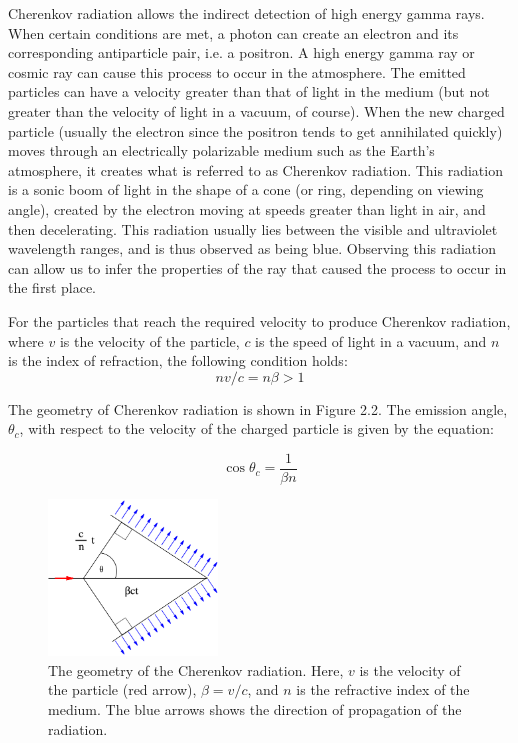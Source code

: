 \documentclass[a4paper, 12pt]{report}
\theoremstyle{definition}
\begin{document}
Cherenkov radiation allows the indirect detection of high energy gamma rays. When certain conditions are met, a photon can create an electron and its corresponding antiparticle pair, i.e. a positron. A high energy gamma ray or cosmic ray can cause this process to occur in the atmosphere. The emitted particles can have a velocity greater than that of light in the medium (but not greater than the velocity of light in a vacuum, of course). When the new charged particle (usually the electron since the positron tends to get annihilated quickly) moves through an electrically polarizable medium such as the Earth's atmosphere, it creates what is referred to as Cherenkov radiation. This radiation is a sonic boom of light in the shape of a cone (or ring, depending on viewing angle), created by the electron moving at speeds greater than light in air, and then decelerating. This radiation usually lies between the visible and ultraviolet wavelength ranges, and is thus observed as being blue. Observing this radiation can allow us to infer the properties of the ray that caused the process to occur in the first place.

For the particles that reach the required velocity to produce Cherenkov radiation, where $v$ is the velocity of the particle, $c$ is the speed of light in a vacuum, and $n$ is the index of refraction, the following condition holds:
\begin{equation}
    nv/c = n\beta > 1
\end{equation}

The geometry of Cherenkov radiation is shown in Figure 2.2. \autocite{cherenkovcom} The emission angle, $\theta_c$, with respect to the velocity of the charged particle is given by the equation:

\begin{equation}
    \cos{\theta_c} = \frac{1}{\beta n}
\end{equation}

\begin{figure}[h!]
    \centering
    \includegraphics[width=0.4\textwidth]{im/cherenkovcom.png}
    \caption{The geometry of the Cherenkov radiation. Here, $v$ is the velocity of the particle (red arrow), $\beta = v/c$, and $n$ is the refractive index of the medium. The blue arrows shows the direction of propagation of the radiation.}
    \label{fig:cherenkovcom}
\end{figure}
\end{document}
